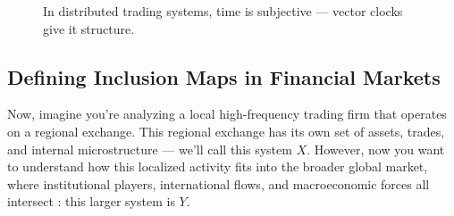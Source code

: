 \begin{figure}[H]
\centering
{}
\caption{In distributed trading systems, time is subjective — vector clocks give it structure.}
\end{figure}



\subsection{Defining Inclusion Maps in Financial Markets}

\vspace{0.5em}
\noindent
Now, imagine you’re analyzing a local high-frequency trading firm that operates on a regional exchange. This regional exchange has its own set of assets, trades, and internal microstructure — we’ll call this system \( X \). However, now you want to understand how this localized activity fits into the broader global market, where institutional players, international flows, and macroeconomic forces all intersect : this larger system is \( Y \).

